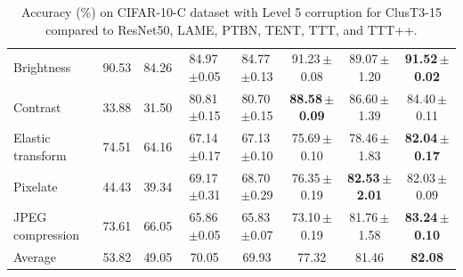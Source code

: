 \documentclass{article}
\newcommand{\ppm}{\,\scriptsize$\pm$}
\begin{document}
\begin{table}[h!]
\begin{small}
{\begin{tabular}{l|ccccccc}
        Brightness & 90.53 & 84.26 & 84.97\ppm0.05 & 84.77\ppm0.13 & 91.23\ppm0.08 & 89.07\ppm1.20 & \textbf{91.52\ppm0.02} \\ 
        Contrast & 33.88 & 31.50 & 80.81\ppm0.15 & 80.70\ppm0.15 & \textbf{88.58\ppm0.09} & 86.60\ppm1.39 & 84.40\ppm0.11 \\ 
        Elastic transform & 74.51 & 64.16 & 67.14\ppm0.17 & 67.13\ppm0.10 & 75.69\ppm0.10 & 78.46\ppm1.83 & \textbf{82.04\ppm0.17} \\ 
        Pixelate & 44.43 & 39.34 & 69.17\ppm0.31 & 68.70\ppm0.29 & 76.35\ppm0.19 & \textbf{82.53\ppm2.01} & 82.03\ppm0.09 \\ 
        JPEG compression & 73.61 & 66.05 & 65.86\ppm0.05 & 65.83\ppm0.07 & 73.10\ppm0.19 & 81.76\ppm1.58 & \textbf{83.24\ppm0.10} \\ \midrule
        Average & 53.82 & 49.05 & 70.05 & 69.93 & 77.32 & 81.46 & \textbf{82.08} \\
        \bottomrule 
    \end{tabular}}
    \end{small}
    \caption{Accuracy (\%) on CIFAR-10-C dataset with Level 5 corruption for ClusT3-15 compared to ResNet50, LAME, PTBN, TENT, TTT, and TTT++.}
	\label{tab:Cifar10cComparison}
\end{table}
\end{document}
